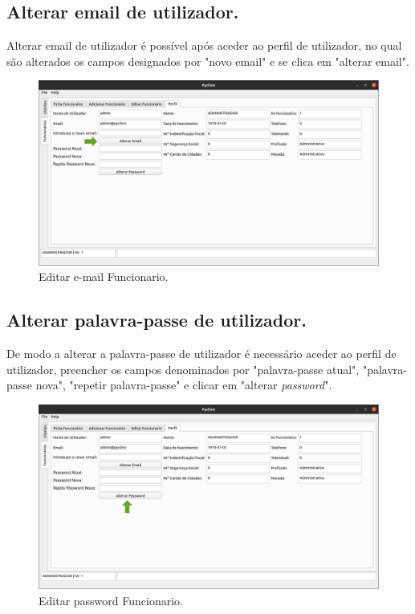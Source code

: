 \documentclass[11pt,a4paper,twoside]{article}
\begin{document}
\subsection{Alterar email de utilizador.}
Alterar email de utilizador é possível após aceder ao perfil de utilizador, no qual são alterados os campos designados por "novo email" e se clica em "alterar email".

\begin{figure}[H]
	\centering
	\includegraphics[width=0.9\linewidth]{image/medico/alteraremail.png}
	\caption{Editar e-mail Funcionario.}
	\label{fig:alteraremail}
\end{figure}

\subsection{Alterar palavra-passe de utilizador.}
De modo a alterar a palavra-passe de utilizador é necessário aceder ao perfil de utilizador, preencher os campos denominados por "palavra-passe atual", "palavra-passe nova", "repetir palavra-passe" e clicar em "alterar \textit{password}".

\begin{figure}[H]
	\centering
	\includegraphics[width=0.9\linewidth]{image/medico/alterarpass.png}
	\caption{Editar password Funcionario.}
	\label{fig:alterarpass}
\end{figure}
\end{document}
